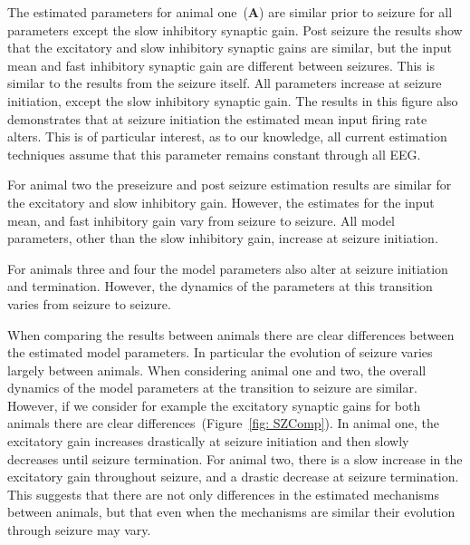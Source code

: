 The estimated parameters for animal one~(\textbf{A}) are similar prior to seizure for all parameters except the slow inhibitory synaptic gain. Post seizure the results show that the excitatory and slow inhibitory synaptic gains are similar, but the input mean and fast inhibitory synaptic gain are different between seizures. This is similar to the results from the seizure itself. All parameters increase at seizure initiation, except the slow inhibitory synaptic gain. The results in this figure also demonstrates that at seizure initiation the estimated mean input firing rate alters. This is of particular interest, as to our knowledge, all current estimation techniques assume that this parameter remains constant through all EEG. 

For animal two the preseizure and post seizure estimation results are similar for the excitatory and slow inhibitory gain. However, the estimates for the input mean, and fast inhibitory gain vary from seizure to seizure. All model parameters, other than the slow inhibitory gain, increase at seizure initiation.  

For animals three and four the model parameters also alter at seizure initiation and termination. However, the dynamics of the parameters at this transition varies from seizure to seizure.

When comparing the results between animals there are clear differences between the estimated model parameters. In particular the evolution of seizure varies largely between animals. When considering animal one and two, the overall dynamics of the model parameters at the transition to seizure are similar. However, if we consider for example the excitatory synaptic gains for both animals there are clear differences~(Figure~\ref{fig: SZComp}). In animal one, the excitatory gain increases drastically at seizure initiation and then slowly decreases until seizure termination. For animal two, there is a slow increase in the excitatory gain throughout seizure, and a drastic decrease at seizure termination. This suggests that there are not only differences in the estimated mechanisms between animals, but that even when the mechanisms are similar their evolution through seizure may vary. 

